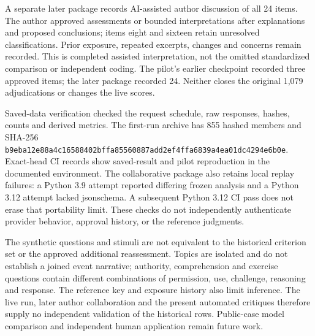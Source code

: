 \documentclass[11pt]{article}
\begin{document}
A separate later package records AI-assisted author discussion of all 24 items. The author approved assessments or bounded interpretations after explanations and proposed conclusions; items eight and sixteen retain unresolved classifications. Prior exposure, repeated excerpts, changes and concerns remain recorded. This is completed assisted interpretation, not the omitted standardized comparison or independent coding. The pilot's earlier checkpoint recorded three approved items; the later package recorded 24. Neither closes the original 1,079 adjudications or changes the live scores.

Saved-data verification checked the request schedule, raw responses, hashes, counts and derived metrics. The first-run archive has 855 hashed members and SHA-256 \texttt{b9eba12e\allowbreak{}88a4c165\allowbreak{}88402bff\allowbreak{}a8556088\allowbreak{}7add2ef4\allowbreak{}ffa6839a\allowbreak{}4ea01dc4\allowbreak{}294e6b0e}. Exact-head CI records show saved-result and pilot reproduction in the documented environment. The collaborative package also retains local replay failures: a Python 3.9 attempt reported differing frozen analysis and a Python 3.12 attempt lacked jsonschema. A subsequent Python 3.12 CI pass does not erase that portability limit. These checks do not independently authenticate provider behavior, approval history, or the reference judgments.

The synthetic questions and stimuli are not equivalent to the historical criterion set or the approved additional reassessment. Topics are isolated and do not establish a joined event narrative; authority, comprehension and exercise questions contain different combinations of permission, use, challenge, reasoning and response. The reference key and exposure history also limit inference. The live run, later author collaboration and the present automated critiques therefore supply no independent validation of the historical rows. Public-case model comparison and independent human application remain future work.
\end{document}
